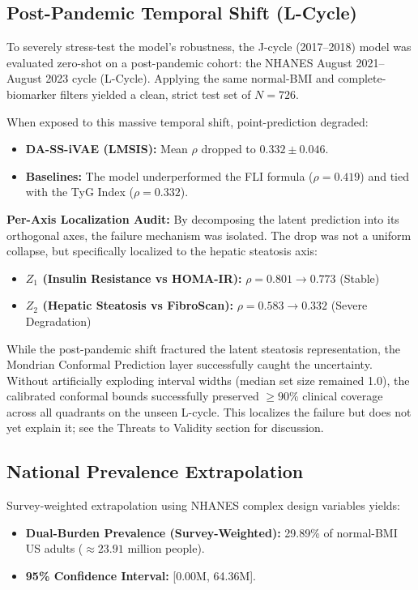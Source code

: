 \documentclass[12pt,a4paper,oneside]{report}
\begin{document}
\subsection{Post-Pandemic Temporal Shift (L-Cycle)}

To severely stress-test the model's robustness, the J-cycle (2017--2018) model was evaluated zero-shot on a post-pandemic cohort: the NHANES August 2021--August 2023 cycle (L-Cycle). Applying the same normal-BMI and complete-biomarker filters yielded a clean, strict test set of $N=726$.

When exposed to this massive temporal shift, point-prediction degraded:
\begin{itemize}[leftmargin=*]
    \item \textbf{DA-SS-iVAE (LMSIS):} Mean $\rho$ dropped to $0.332 \pm 0.046$.
    \item \textbf{Baselines:} The model underperformed the FLI formula ($\rho=0.419$) and tied with the TyG Index ($\rho=0.332$).
\end{itemize}

\textbf{Per-Axis Localization Audit:} By decomposing the latent prediction into its orthogonal axes, the failure mechanism was isolated. The drop was not a uniform collapse, but specifically localized to the hepatic steatosis axis:
\begin{itemize}[leftmargin=*]
    \item \textbf{$Z_1$ (Insulin Resistance vs HOMA-IR):} $\rho = 0.801 \rightarrow 0.773$ (Stable)
    \item \textbf{$Z_2$ (Hepatic Steatosis vs FibroScan):} $\rho = 0.583 \rightarrow 0.332$ (Severe Degradation)
\end{itemize}

While the post-pandemic shift fractured the latent steatosis representation, the Mondrian Conformal Prediction layer successfully caught the uncertainty. Without artificially exploding interval widths (median set size remained 1.0), the calibrated conformal bounds successfully preserved $\geq 90\%$ clinical coverage across all quadrants on the unseen L-cycle. This localizes the failure but does not yet explain it; see the Threats to Validity section for discussion.

\subsection{National Prevalence Extrapolation}

Survey-weighted extrapolation using NHANES complex design variables yields:
\begin{itemize}[leftmargin=*]
    \item \textbf{Dual-Burden Prevalence (Survey-Weighted):} 29.89\% of normal-BMI US adults ($\approx 23.91$ million people).
    \item \textbf{95\% Confidence Interval:} [0.00M, 64.36M].
\end{itemize}
\end{document}
